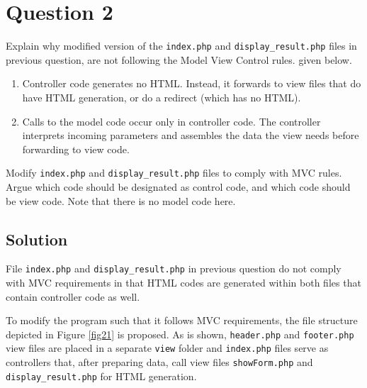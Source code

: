 
\section*{Question 2}

Explain why modified version of the \texttt{index.php} and \texttt{display\_result.php} files in previous question, are not following the Model View Control rules.
given below.
\begin{enumerate}
\item Controller code generates no HTML. Instead, it forwards to view files that do have HTML generation, or do a redirect (which has no HTML).
\item Calls to the model code occur only in controller code. The controller interprets incoming parameters and assembles the data the view needs before forwarding to view code.
\end{enumerate}
Modify \texttt{index.php} and \texttt{display\_result.php} files to comply with MVC rules. Argue which code should be designated as control code, and which code should be view code. Note that there is no model code here.

\subsection*{Solution}

File \texttt{index.php} and \texttt{display\_result.php} in previous question do not comply with MVC requirements in that HTML codes are generated within both files that contain controller code as well.

To modify the program such that it follows MVC requirements, the file structure depicted in Figure \ref{fig21} is proposed. As is shown, \texttt{header.php} and \texttt{footer.php} view files are placed in a separate \texttt{view} folder and \texttt{index.php} files serve as controllers that, after preparing data, call view files \texttt{showForm.php} and \texttt{display\_result.php} for HTML generation. 

